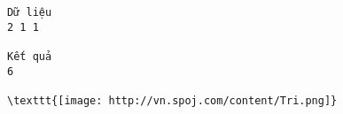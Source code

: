 \begin{verbatim}
Dữ liệu
2 1 1	

Kết quả
6 

\texttt{[image: http://vn.spoj.com/content/Tri.png]}\end{verbatim}